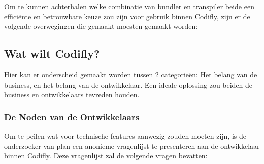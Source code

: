 
\chapter{}
\label{ch:methodologie}


Om te kunnen achterhalen welke combinatie van bundler en transpiler beide een efficiënte en betrouwbare keuze zou zijn voor gebruik binnen Codifly, zijn er de volgende overwegingen die gemaakt moesten gemaakt worden:

\section{Wat wilt Codifly?}

Hier kan er onderscheid gemaakt worden tussen 2 categorieën: Het belang van de business, en het belang van de ontwikkelaar. Een ideale oplossing zou beiden de business en ontwikkelaars tevreden houden.

\subsection{De Noden van de Ontwikkelaars}

Om te peilen wat voor technische features aanwezig zouden moeten zijn, is de onderzoeker van plan een anonieme vragenlijst te presenteren aan de ontwikkelaar binnen Codifly. Deze vragenlijst zal de volgende vragen bevatten:

